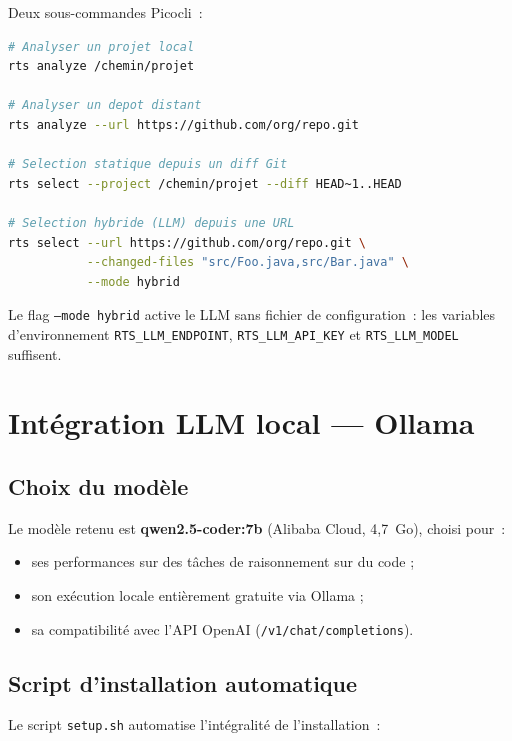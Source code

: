 \documentclass[12pt,a4paper]{article}
\begin{document}
Deux sous-commandes Picocli~:

\begin{lstlisting}[language=bash]
# Analyser un projet local
rts analyze /chemin/projet

# Analyser un depot distant
rts analyze --url https://github.com/org/repo.git

# Selection statique depuis un diff Git
rts select --project /chemin/projet --diff HEAD~1..HEAD

# Selection hybride (LLM) depuis une URL
rts select --url https://github.com/org/repo.git \
           --changed-files "src/Foo.java,src/Bar.java" \
           --mode hybrid
\end{lstlisting}

Le flag \texttt{--mode hybrid} active le LLM sans fichier de configuration~:
les variables d'environnement \texttt{RTS\_LLM\_ENDPOINT},
\texttt{RTS\_LLM\_API\_KEY} et \texttt{RTS\_LLM\_MODEL} suffisent.

\section{Intégration LLM local — Ollama}

\subsection{Choix du modèle}

Le modèle retenu est \textbf{qwen2.5-coder:7b} (Alibaba Cloud, 4,7~Go), choisi
pour~:
\begin{itemize}[noitemsep]
  \item ses performances sur des tâches de raisonnement sur du code ;
  \item son exécution locale entièrement gratuite via Ollama ;
  \item sa compatibilité avec l'API OpenAI (\texttt{/v1/chat/completions}).
\end{itemize}

\subsection{Script d'installation automatique}

Le script \texttt{setup.sh} automatise l'intégralité de l'installation~:
\end{document}

